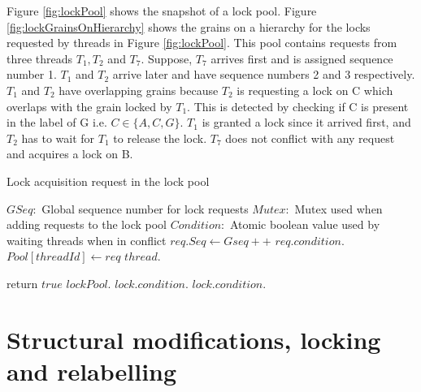 Figure \ref{fig:lockPool} shows the snapshot of a lock pool. Figure \ref{fig:lockGrainsOnHierarchy} shows the grains on a hierarchy for the locks requested by threads in Figure \ref{fig:lockPool}. This pool contains requests from three threads $T_1, T_2$ and $T_7$. Suppose, $T_7$ arrives first and is assigned sequence number 1. $T_1$ and $T_2$ arrive later and have sequence numbers 2 and 3 respectively. 
$T_1$ and $T_2$ have overlapping grains because $T_2$ is requesting a lock on C which overlaps with the grain locked by $T_1$. This is detected by checking if C is present in the label of G i.e. $C \in \{A, C, G\}$. $T_1$ is granted a lock since it arrived first, and $T_2$ has to wait for $T_1$ to release the lock. $T_7$ does not conflict with any request and acquires a lock on B.


\begin{algorithm}
	\caption{Lock acquisition request in the lock pool}\label{lockFunction}
	\begin{algorithmic}[1]
		\State $GSeq: $ Global sequence number for lock requests
		\State $Mutex: $ Mutex used when adding requests to the lock pool
		\State $Condition:$ Atomic boolean value used by waiting threads when in conflict
		\Statex
		\State {}
		\State $req.Seq \gets Gseq++$ \label{seqNoAllocation}
		\State $req.condition.$ \label{waitTrue}
		\State $Pool[threadId] \gets req$ \label{addToPool}
		\State {}
		 \label{conflictCheck}
		\State $thread.$
		\EndIf
		
		\EndFor
		\State return $true$
		\EndProcedure
		\Statex
		\State $lockPool.$
		\State $lock.condition.$
		\State $lock.condition.$
		\EndProcedure
	\end{algorithmic}
\end{algorithm}






\section{Structural modifications, locking and relabelling}

